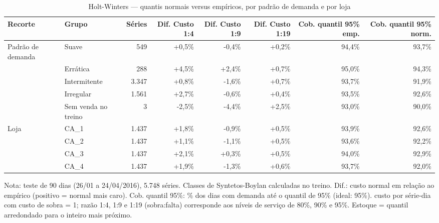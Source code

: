 \begin{table}[htbp]
\centering
\small
\caption{Holt-Winters — quantis normais versus empíricos, por padrão de demanda e por loja}
\label{tab:hw_empirico_vs_normal_por_grupo}
\begin{tabular}{llrrrrrr}
\toprule
Recorte & Grupo & Séries & Dif. Custo 1:4 & Dif. Custo 1:9 & Dif. Custo 1:19 & Cob. quantil 95\% emp. & Cob. quantil 95\% norm. \\
\midrule
Padrão de demanda & Suave & 549 & +0,5\% & -0,4\% & +0,2\% & 94,4\% & 93,7\% \\
 & Errática & 288 & +4,5\% & +2,4\% & +0,7\% & 95,0\% & 94,3\% \\
 & Intermitente & 3.347 & +0,8\% & -1,6\% & +0,7\% & 93,7\% & 91,9\% \\
 & Irregular & 1.561 & +2,7\% & -0,6\% & +0,4\% & 93,5\% & 92,6\% \\
 & Sem venda no treino & 3 & -2,5\% & -4,4\% & +2,5\% & 93,0\% & 90,0\% \\
\addlinespace
Loja & CA\_1 & 1.437 & +1,8\% & -0,9\% & +0,5\% & 93,9\% & 92,6\% \\
 & CA\_2 & 1.437 & +1,1\% & -1,1\% & +0,5\% & 93,6\% & 92,2\% \\
 & CA\_3 & 1.437 & +2,1\% & +0,3\% & +0,5\% & 94,0\% & 92,9\% \\
 & CA\_4 & 1.437 & +1,9\% & -1,3\% & +0,6\% & 93,7\% & 92,0\% \\
\bottomrule
\end{tabular}
\par\smallskip
{\footnotesize Nota: teste de 90 dias (26/01 a 24/04/2016), 5.748 séries. Classes de Syntetos-Boylan calculadas no treino. Dif.: custo normal em relação ao empírico (positivo = normal mais caro). Cob. quantil 95\%: \% dos dias com demanda até o quantil de 95\% (ideal: 95\%). custo por série-dia com custo de sobra = 1; razão 1:4, 1:9 e 1:19 (sobra:falta) corresponde aos níveis de serviço de 80\%, 90\% e 95\%. Estoque = quantil arredondado para o inteiro mais próximo.}
\end{table}
